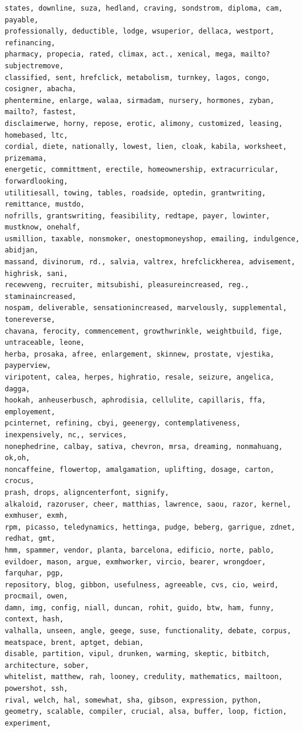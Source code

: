 \documentclass[a4paper,12pt]{article}
\begin{document}
\begin{verbatim}
states, downline, suza, hedland, craving, sondstrom, diploma, cam, payable, 
professionally, deductible, lodge, wsuperior, dellaca, westport, refinancing, 
pharmacy, propecia, rated, climax, act., xenical, mega, mailto?subjectremove, 
classified, sent, hrefclick, metabolism, turnkey, lagos, congo, cosigner, abacha, 
phentermine, enlarge, walaa, sirmadam, nursery, hormones, zyban, mailto?, fastest, 
disclaimerwe, horny, repose, erotic, alimony, customized, leasing, homebased, ltc, 
cordial, diete, nationally, lowest, lien, cloak, kabila, worksheet, prizemama, 
energetic, committment, erectile, homeownership, extracurricular, forwardlooking, 
utilitiesall, towing, tables, roadside, optedin, grantwriting, remittance, mustdo, 
nofrills, grantswriting, feasibility, redtape, payer, lowinter, mustknow, onehalf, 
usmillion, taxable, nonsmoker, onestopmoneyshop, emailing, indulgence, abidjan, 
massand, divinorum, rd., salvia, valtrex, hrefclickherea, advisement, highrisk, sani, 
recewveng, recruiter, mitsubishi, pleasureincreased, reg., staminaincreased, 
nospam, deliverable, sensationincreased, marvelously, supplemental, tonereverse, 
chavana, ferocity, commencement, growthwrinkle, weightbuild, fige, untraceable, leone, 
herba, prosaka, afree, enlargement, skinnew, prostate, vjestika, payperview, 
viripotent, calea, herpes, highratio, resale, seizure, angelica, dagga, 
hookah, anheuserbusch, aphrodisia, cellulite, capillaris, ffa, employement, 
pcinternet, refining, cbyi, geenergy, contemplativeness, inexpensively, nc,, services, 
nonephedrine, calbay, sativa, chevron, mrsa, dreaming, nonmahuang, ok,oh,
noncaffeine, flowertop, amalgamation, uplifting, dosage, carton, crocus, 
prash, drops, aligncenterfont, signify, 
alkaloid, razoruser, cheer, matthias, lawrence, saou, razor, kernel, exmhuser, exmh, 
rpm, picasso, teledynamics, hettinga, pudge, beberg, garrigue, zdnet, redhat, gmt, 
hmm, spammer, vendor, planta, barcelona, edificio, norte, pablo, 
evildoer, mason, argue, exmhworker, vircio, bearer, wrongdoer, farquhar, pgp, 
repository, blog, gibbon, usefulness, agreeable, cvs, cio, weird, procmail, owen,
damn, img, config, niall, duncan, rohit, guido, btw, ham, funny, context, hash, 
valhalla, unseen, angle, geege, suse, functionality, debate, corpus, 
meatspace, brent, aptget, debian, 
disable, partition, vipul, drunken, warming, skeptic, bitbitch, architecture, sober, 
whitelist, matthew, rah, looney, credulity, mathematics, mailtoon, powershot, ssh, 
rival, welch, hal, somewhat, sha, gibson, expression, python, 
geometry, scalable, compiler, crucial, alsa, buffer, loop, fiction, experiment, 

\end{verbatim}
\end{document}
